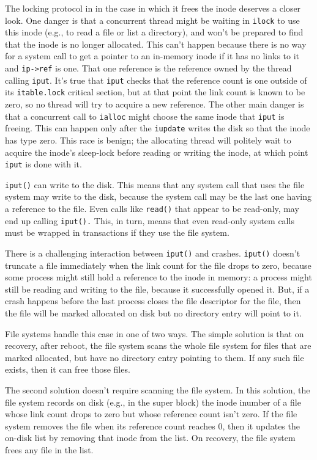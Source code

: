 The locking protocol in 
in the case in which it frees the inode deserves a closer look.
One danger is that a concurrent thread might be waiting in
\lstinline{ilock}
to use this inode (e.g., to read a file or list a directory),
and won't be prepared to find that the inode is no longer
allocated. This can't happen because there is no way for
a system call to get a pointer to an in-memory inode if it has
no links to it and 
\lstinline{ip->ref}
is one. That one reference is the reference owned by the
thread calling
\lstinline{iput}.
It's true that 
\lstinline{iput}
checks that the reference count is one outside of its
\lstinline{itable.lock}
critical section, but at that point the link
count is known to be zero, so no thread will try
to acquire a new reference.
The other main danger is that a concurrent call to
\lstinline{ialloc}
might choose the same inode that
\lstinline{iput}
is freeing.
This can happen only after the
\lstinline{iupdate}
writes the disk so that the inode has type zero.
This race is benign; the allocating thread will politely wait
to acquire the inode's sleep-lock before reading or writing
the inode, at which point
\lstinline{iput}
is done with it.

\lstinline{iput()}
can write to the disk.  This means that any system call that uses the file
system may write to the disk, because the system call may be the last one having
a reference to the file. Even calls like
\lstinline{read()}
that appear to be read-only, may end up calling
\lstinline{iput().}
This, in turn, means that even read-only system calls
must be wrapped in transactions if they use the file system.

There is a challenging interaction between
\lstinline{iput()}
and crashes.
\lstinline{iput()}
doesn't truncate a file immediately when the link count for the file
drops to zero, because some process might still hold a reference to the inode in
memory: a process might still be reading and writing to the file, because it
successfully opened it. But, if a crash happens before the last process closes
the file descriptor for the file, then the file will be marked allocated on disk
but no directory entry will point to it.

File systems handle this case in one of two ways. The simple solution is that on
recovery, after reboot, the file system scans the whole file system for files
that are marked allocated, but have no directory entry pointing to them.  If any
such file exists, then it can free those files.

The second solution doesn't require scanning the file system.  In this solution,
the file system records on disk (e.g., in the super block) the inode inumber of
a file whose link count drops to zero but whose reference count isn't zero.  If
the file system removes the file when its reference count reaches 0, then it
updates the on-disk list by removing that inode from the list. On recovery, the
file system frees any file in the list.


